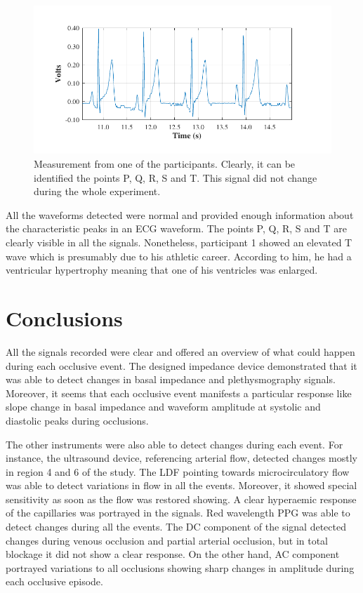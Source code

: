 \begin{figure}[!htbp]
	\centering
	\includegraphics{figure19}    
	\caption[ECG measurement acquired by the system]{Measurement from one of the participants. Clearly, it can be identified the points P, Q, R, S and T. This signal did not change during the whole experiment.}
	\label{fig:ECG}
\end{figure} 

All the waveforms detected were normal and provided enough information about the characteristic peaks in an ECG waveform. The points P, Q, R, S and T are clearly visible in all the signals. Nonetheless, participant 1 showed an elevated T wave which is presumably due to his athletic career. According to him, he had a ventricular hypertrophy meaning that one of his ventricles was enlarged.  

\section{Conclusions}
\label{section results 10}
All the signals recorded were clear and offered an overview of what could happen during each occlusive event. The designed impedance device demonstrated that it was able to detect changes in basal impedance and plethysmography signals. Moreover, it seems that each occlusive event manifests a particular response like slope change in basal impedance and waveform amplitude at systolic and diastolic peaks during occlusions. 

The other instruments were also able to detect changes during each event. For instance, the ultrasound device, referencing arterial flow, detected changes mostly in region 4 and 6 of the study. The LDF pointing towards microcirculatory flow was able to detect variations in flow in all the events. Moreover, it showed special sensitivity as soon as the flow was restored showing.  A clear hyperaemic response of the capillaries was portrayed in the signals. Red wavelength PPG was able to detect changes during all the events. The DC component of the signal detected changes during venous occlusion and partial arterial occlusion, but in total blockage it did not show a clear response. On the other hand, AC component portrayed variations to all occlusions showing sharp changes in amplitude during each occlusive episode. 